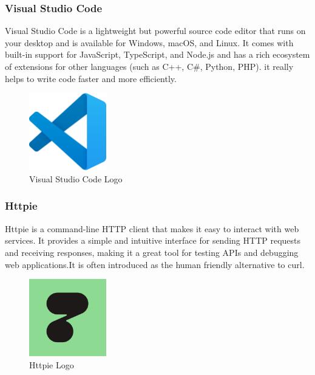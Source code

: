 \subsubsection{Visual Studio Code}

Visual Studio Code is a lightweight but powerful source code editor that runs
on your desktop and is available for Windows, macOS, and Linux. It comes with
built-in support for JavaScript, TypeScript, and Node.js and has a rich
ecosystem of extensions for other languages (such as C++, C\#, Python, PHP). it really
helps to write code faster and more efficiently.
\begin{figure}[h!]
      \centering
      \includegraphics[width=0.3\textwidth]{../images/vscode.png}
      \caption{Visual Studio Code Logo}
      \label{fig:vscode}
\end{figure}

\subsubsection{Httpie}

Httpie is a command-line HTTP client that makes it easy to interact with web
services. It provides a simple and intuitive interface for sending HTTP
requests and receiving responses, making it a great tool for testing APIs and
debugging web applications.It is often introduced as the human friendly alternative to curl.

\begin{figure}[h!]
      \centering
      \includegraphics[width=0.3\textwidth]{../images/httpie.png}
      \caption{Httpie Logo}
      \label{fig:httpie}
\end{figure}

